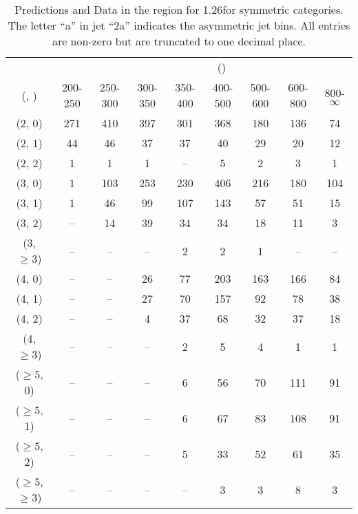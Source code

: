 \begin{table}[h!]
\tiny
\centering
\caption{Predictions and Data in the \mj region for 1.26\ifb for symmetric categories. The letter ``a'' in jet \eg ``2a''  indicates the asymmetric jet bins. All entries are non-zero but are truncated to one decimal place.\label{tab:yieldsseppost_mu_data_sym}}
\begin{tabular}
{ccccccccc}
	\hline\hline
&	& \multicolumn{8}{c}{\scalht (\gev)} \\ 
	 (\njet,  \nb) & 200-250 & 250-300 & 300-350 & 350-400 & 400-500 & 500-600 & 600-800 & 800-$\infty$ \\ [0.8ex] 
\hline
	(2, 0) & 271 & 410 & 397 & 301 & 368 & 180 & 136 & 74 \\[0.5ex] 
	(2, 1) & 44 & 46 & 37 & 37 & 40 & 29 & 20 & 12 \\[0.5ex] 
	(2, 2) & 1 & 1 & 1 & -- & 5 & 2 & 3 & 1 \\[0.5ex] 
	(3, 0) & 1 & 103 & 253 & 230 & 406 & 216 & 180 & 104 \\[0.5ex] 
	(3, 1) & 1 & 46 & 99 & 107 & 143 & 57 & 51 & 15 \\[0.5ex] 
	(3, 2) & -- & 14 & 39 & 34 & 34 & 18 & 11 & 3 \\[0.5ex] 
	(3, $\ge3$) & -- & -- & -- & 2 & 2 & 1 & -- & -- \\[0.5ex] 
	(4, 0) & -- & -- & 26 & 77 & 203 & 163 & 166 & 84 \\[0.5ex] 
	(4, 1) & -- & -- & 27 & 70 & 157 & 92 & 78 & 38 \\[0.5ex] 
	(4, 2) & -- & -- & 4 & 37 & 68 & 32 & 37 & 18 \\[0.5ex] 
	(4, $\ge3$) & -- & -- & -- & 2 & 5 & 4 & 1 & 1 \\[0.5ex] 
	($\ge5$, 0) & -- & -- & -- & 6 & 56 & 70 & 111 & 91 \\[0.5ex] 
	($\ge5$, 1) & -- & -- & -- & 6 & 67 & 83 & 108 & 91 \\[0.5ex] 
	($\ge5$, 2) & -- & -- & -- & 5 & 33 & 52 & 61 & 35 \\[0.5ex] 
	($\ge5$, $\ge3$) & -- & -- & -- & -- & 3 & 3 & 8 & 3 \\[0.5ex] 
	\hline
	\hline
\end{tabular}
\end{table}
